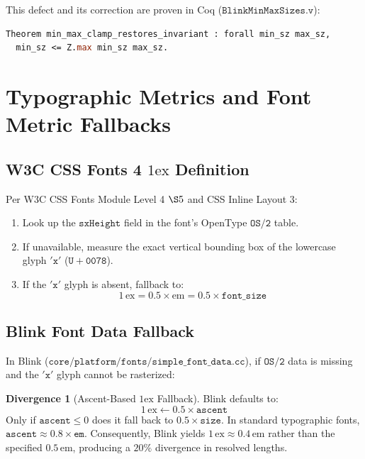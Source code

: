 \documentclass[11pt,a4paper]{article}
\theoremstyle{definition}
\newtheorem{divergence}{Divergence}[section]
\begin{document}
This defect and its correction are proven in Coq ($\mathtt{BlinkMinMaxSizes.v}$):
\begin{lstlisting}[language=Caml,basicstyle=\small\ttfamily]
Theorem min_max_clamp_restores_invariant : forall min_sz max_sz,
  min_sz <= Z.max min_sz max_sz.
\end{lstlisting}

\section{Typographic Metrics and Font Metric Fallbacks}

\subsection{W3C CSS Fonts 4 $1\text{ex}$ Definition}
Per W3C CSS Fonts Module Level 4 $\S 5$ and CSS Inline Layout 3:
\begin{enumerate}
    \item Look up the $\mathtt{sxHeight}$ field in the font's OpenType $\mathtt{OS/2}$ table.
    \item If unavailable, measure the exact vertical bounding box of the lowercase glyph $\mathtt{'x'}$ ($\mathtt{U+0078}$).
    \item If the $\mathtt{'x'}$ glyph is absent, fallback to:
    \begin{equation}
        1\,\text{ex} = 0.5 \times \text{em} = 0.5 \times \mathtt{font\_size}
    \end{equation}
\end{enumerate}

\subsection{Blink Font Data Fallback}
In Blink ($\mathtt{core/platform/fonts/simple\_font\_data.cc}$), if $\mathtt{OS/2}$ data is missing and the $\mathtt{'x'}$ glyph cannot be rasterized:
\begin{divergence}[Ascent-Based $1\text{ex}$ Fallback]
Blink defaults to:
\begin{equation}
    1\,\text{ex} \gets 0.5 \times \mathtt{ascent}
\end{equation}
Only if $\mathtt{ascent} \le 0$ does it fall back to $0.5 \times \mathtt{size}$. In standard typographic fonts, $\mathtt{ascent} \approx 0.8 \times \mathtt{em}$. Consequently, Blink yields $1\,\text{ex} \approx 0.4\,\text{em}$ rather than the specified $0.5\,\text{em}$, producing a $20\%$ divergence in resolved lengths.
\end{divergence}
\end{document}
